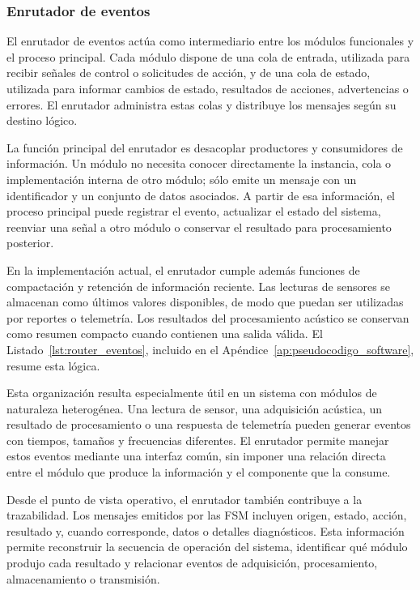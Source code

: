 \subsubsection{Enrutador de eventos}
\label{subsubsec:enrutador_eventos}

El enrutador de eventos actúa como intermediario entre los módulos funcionales y el proceso principal. Cada módulo dispone de una cola de entrada, utilizada para recibir señales de control o solicitudes de acción, y de una cola de estado, utilizada para informar cambios de estado, resultados de acciones, advertencias o errores. El enrutador administra estas colas y distribuye los mensajes según su destino lógico.

La función principal del enrutador es desacoplar productores y consumidores de información. Un módulo no necesita conocer directamente la instancia, cola o implementación interna de otro módulo; sólo emite un mensaje con un identificador y un conjunto de datos asociados. A partir de esa información, el proceso principal puede registrar el evento, actualizar el estado del sistema, reenviar una señal a otro módulo o conservar el resultado para procesamiento posterior.

En la implementación actual, el enrutador cumple además funciones de compactación y retención de información reciente. Las lecturas de sensores se almacenan como últimos valores disponibles, de modo que puedan ser utilizadas por reportes o telemetría. Los resultados del procesamiento acústico se conservan como resumen compacto cuando contienen una salida válida. El Listado~\ref{lst:router_eventos}, incluido en el Apéndice~\ref{ap:pseudocodigo_software}, resume esta lógica.

Esta organización resulta especialmente útil en un sistema con módulos de naturaleza heterogénea. Una lectura de sensor, una adquisición acústica, un resultado de procesamiento o una respuesta de telemetría pueden generar eventos con tiempos, tamaños y frecuencias diferentes. El enrutador permite manejar estos eventos mediante una interfaz común, sin imponer una relación directa entre el módulo que produce la información y el componente que la consume.

Desde el punto de vista operativo, el enrutador también contribuye a la trazabilidad. Los mensajes emitidos por las FSM incluyen origen, estado, acción, resultado y, cuando corresponde, datos o detalles diagnósticos. Esta información permite reconstruir la secuencia de operación del sistema, identificar qué módulo produjo cada resultado y relacionar eventos de adquisición, procesamiento, almacenamiento o transmisión.

